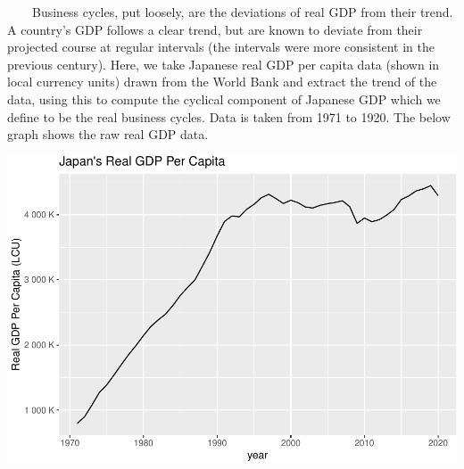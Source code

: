 \documentclass[
]{article}
\newenvironment{Shaded}{\begin{snugshade}}{\end{snugshade}}
\newcommand{\CommentTok}[1]{\textcolor[rgb]{0.56,0.35,0.01}{\textit{#1}}}
\newcommand{\DataTypeTok}[1]{\textcolor[rgb]{0.13,0.29,0.53}{#1}}
\newcommand{\DecValTok}[1]{\textcolor[rgb]{0.00,0.00,0.81}{#1}}
\newcommand{\FloatTok}[1]{\textcolor[rgb]{0.00,0.00,0.81}{#1}}
\newcommand{\KeywordTok}[1]{\textcolor[rgb]{0.13,0.29,0.53}{\textbf{#1}}}
\newcommand{\NormalTok}[1]{#1}
\newcommand{\OperatorTok}[1]{\textcolor[rgb]{0.81,0.36,0.00}{\textbf{#1}}}
\newcommand{\OtherTok}[1]{\textcolor[rgb]{0.56,0.35,0.01}{#1}}
\newcommand{\StringTok}[1]{\textcolor[rgb]{0.31,0.60,0.02}{#1}}
\begin{document}
~~~~Business cycles, put loosely, are the deviations of real GDP from
their trend. A country's GDP follows a clear trend, but are known to
deviate from their projected course at regular intervals (the intervals
were more consistent in the previous century). Here, we take Japanese
real GDP per capita data (shown in local currency units) drawn from the
World Bank and extract the trend of the data, using this to compute the
cyclical component of Japanese GDP which we define to be the real
business cycles. Data is taken from 1971 to 1920. The below graph shows
the raw real GDP data.

\begin{Shaded}
\end{Shaded}

\includegraphics{rbc_report_files/figure-latex/data-1.pdf}
\end{document}
